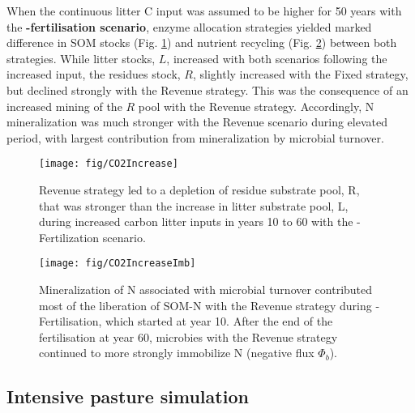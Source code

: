When the continuous litter C input was assumed to be higher for 50 years with
the \textbf{-fertilisation scenario}, enzyme allocation strategies
yielded marked difference in SOM stocks (Fig. \ref{fig:CO2Increase}) and
nutrient recycling (Fig. \ref{fig:CO2IncreaseImb}) between both strategies.
While litter stocks, $L$, increased with both scenarios following the increased
input, the residues stock, $R$, slightly increased with the Fixed strategy, but
declined strongly with the Revenue strategy. This was the consequence of an
increased mining of the $R$ pool with the Revenue strategy. Accordingly, N
mineralization was much stronger with the Revenue scenario during elevated
 period, with largest contribution from mineralization by microbial
turnover.


\begin{figure}[t] \vspace*{2mm}
\begin{center}
\texttt{[image: fig/CO2Increase]}
\end{center}
\caption{
Revenue strategy led to a depletion of residue substrate pool, R, that was
stronger than the increase in litter substrate pool, L, during increased carbon
litter inputs in years 10 to 60 with the -Fertilization scenario.
\label{fig:CO2Increase}}

\end{figure}
\begin{figure}[t] \vspace*{2mm}
\begin{center}
\texttt{[image: fig/CO2IncreaseImb]} 
\end{center}
\caption{
Mineralization of N associated with microbial turnover 
contributed most of the liberation of SOM-N with the Revenue strategy during
-Fertilisation, which started at year 10. 
After the end of the fertilisation at year 60, microbies with the Revenue
strategy continued to more strongly immobilize N (negative flux $\Phi_b$).
\label{fig:CO2IncreaseImb}}
\end{figure}

\subsection{Intensive pasture simulation}
\label{sec:ResultsPasture}

